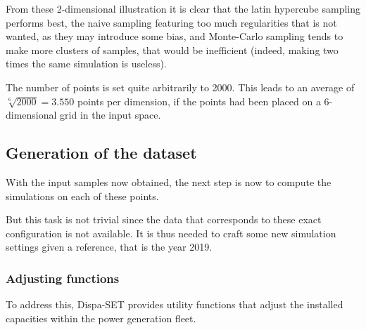From these 2-dimensional illustration it is clear that the latin hypercube sampling performs best, the naive sampling featuring too much regularities that is not wanted, as they may introduce some bias, and Monte-Carlo sampling tends to make more clusters of samples, that would be inefficient (indeed, making two times the same simulation is useless).

The number of points is set quite arbitrarily to 2000. This leads to an average of $\sqrt[6]{2000} = 3.550$ points per dimension, if the points had been placed on a 6-dimensional grid in the input space. 

\subsection{Generation of the dataset}

With the input samples now obtained, the next step is now to compute the simulations on each of these points.

But this task is not trivial since the data that corresponds to these exact configuration is not available. It is thus needed to craft some new simulation settings given a reference, that is the year 2019.

\subsubsection{Adjusting functions}
To address this, Dispa-SET provides utility functions that adjust the installed capacities within the power generation fleet.


